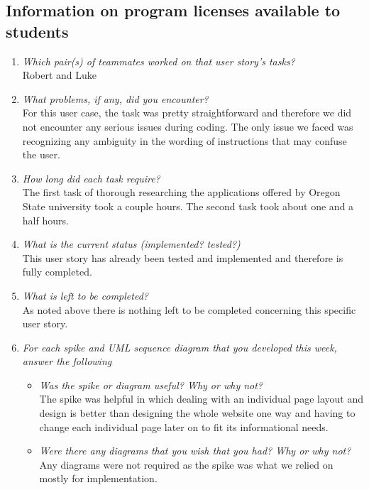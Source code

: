\documentclass[12pt, letterpaper]{article}
\begin{document}
	   \subsection{Information on program licenses available to students}
	   \begin{enumerate}
	   	\item \emph{Which pair(s) of teammates worked on that user story's tasks?}
	   	\\Robert and Luke
	   	\item \emph{What problems, if any, did you encounter?}
	   	\\ For this user case, the task was pretty straightforward and therefore we did not encounter any serious issues during coding.  The only issue we faced was recognizing any ambiguity in the wording of instructions that may confuse the user.
	   	\item \emph{How long did each task require?}
	   	\\The first task of thorough researching the applications offered by Oregon State university took a couple hours.  The second task took about one and a half hours.
	   	
	   	\item \emph{What is the current status (implemented? tested?)}
	   	\\This user story has already been tested and implemented and therefore is fully completed.
	   	\item \emph{What is left to be completed?}
	   	\\  As noted above there is nothing left to be completed concerning this specific user story.
	   	\item \emph{For each spike and UML sequence diagram that you developed this week, answer the following}
	   	\begin{itemize}
	   		\item \emph{Was the spike or diagram useful? Why or why not?}
	   		\\The spike was helpful in which dealing with an individual page layout and design is better than designing the whole website one way and having to change each individual page later on to fit its informational needs. 
	   		\item \emph{Were there any diagrams that you wish that you had? Why or why not?}
	   		\\Any diagrams were not required as the spike was what we relied on mostly for implementation.
	   	\end{itemize}
	   \end{enumerate}
   
\end{document}
